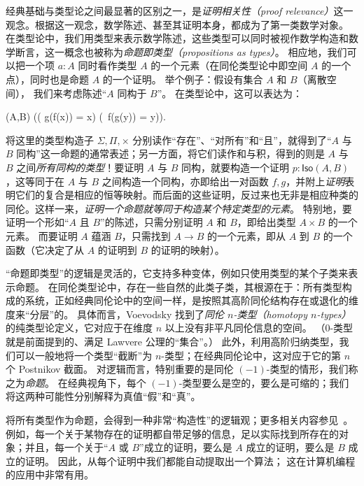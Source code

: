 经典基础与类型论之间最显著的区别之一，是\emph{证明相关性（proof relevance）}这一观念。根据这一观念，数学陈述、甚至其证明本身，都成为了第一类数学对象。
在类型论中，我们用类型来表示数学陈述，这些类型可以同时被视作数学构造和数学断言，这一概念也被称为\emph{命题即类型（propositions as types）}。
%
相应地，我们可以把一个项 $a : A$ 同时看作类型 $A$ 的一个元素（在同伦类型论中即空间 $A$ 的一个点），同时也是命题 $A$ 的一个证明。
举个例子：假设有集合 $A$ 和 $B$（离散空间），
%
我们来考虑陈述``$A$ 同构于 $B$''。
在类型论中，这可以表达为：
\begin{narrowmultline*}
  (A,B)  \narrowbreak
  \Big(\big( g(f(x)) = x\big) \times \big(\, f(g(y)) = y\big)\Big).
\end{narrowmultline*}
%
将这里的类型构造子 $\Sigma, \Pi, \times$ 分别读作``存在''、``对所有''和``且''，就得到了``$A$ 与 $B$ 同构''这一命题的通常表述；另一方面，将它们读作和与积，得到的则是 $A$ 与 $B$ 之间\emph{所有同构的类型}！要证明 $A$ 与 $B$ 同构，就要构造一个证明 $p : \mathsf{Iso}(A,B)$，这等同于在 $A$ 与 $B$ 之间构造一个同构，亦即给出一对函数 $f, g$，并附上\emph{证明}表明它们的复合是相应的恒等映射。而后面的这些证明，反过来也无非是相应种类的同伦。这样一来，\emph{证明一个命题就等同于构造某个特定类型的元素}。
特别地，要证明一个形如``$A$ 且 $B$''的陈述，只需分别证明 $A$ 和 $B$，即给出类型 $A\times B$ 的一个元素。
而要证明 $A$ 蕴涵 $B$，只需找到 $A\to B$ 的一个元素，即从 $A$ 到 $B$ 的一个函数（它决定了从 $A$ 的证明到 $B$ 的证明的映射）。

“命题即类型”的逻辑是灵活的，它支持多种变体，例如只使用类型的某个子类来表示命题。
在同伦类型论中，存在一些自然的此类子类，其根源在于：所有类型构成的系统，正如经典同伦论中的空间一样，是按照其高阶同伦结构存在或退化的维度来“分层”的。
具体而言，Voevodsky 找到了\emph{同伦 $n$-类型（homotopy $n$-types）}的纯类型论定义，它对应于在维度 $n$ 以上没有非平凡同伦信息的空间。
（$0$-类型就是前面提到的、满足 Lawvere 公理的“集合”。）
此外，利用高阶归纳类型，我们可以一般地将一个类型“截断”为 $n$-类型；在经典同伦论中，这对应于它的第 $n$ 个 Postnikov 截面。
对逻辑而言，特别重要的是同伦 $(-1)$-类型的情形，我们称之为\emph{命题}。
在经典视角下，每个 $(-1)$-类型要么是空的，要么是可缩的；我们将这两种可能性分别解释为真值“假”和“真”。

将所有类型作为命题，会得到一种非常“构造性”的逻辑观；更多相关内容参见~\cite{kolmogorov,TroelstraI,TroelstraII}。
例如，每一个关于某物存在的证明都自带足够的信息，足以实际找到所存在的对象；并且，每一个关于“$A$ 或 $B$”成立的证明，要么是 $A$ 成立的证明，要么是 $B$ 成立的证明。
因此，从每个证明中我们都能自动提取出一个算法；  这在计算机编程的应用中非常有用。

